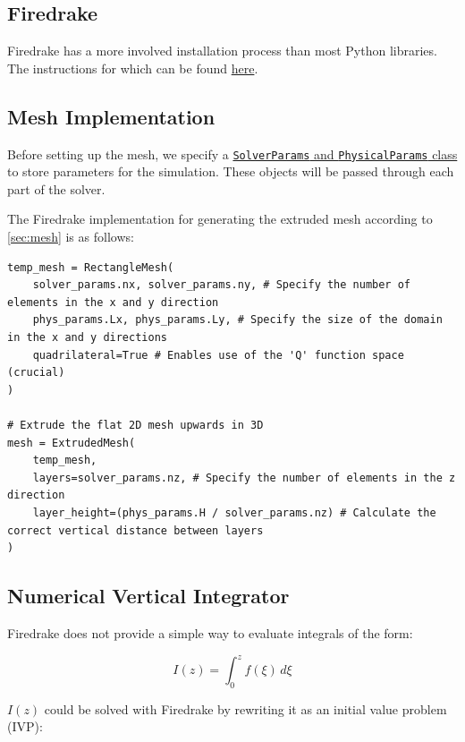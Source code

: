 \documentclass{article}
\begin{document}
\newpage
\begin{appendices}

\section{Firedrake}

Firedrake has a more involved installation process than most Python libraries.
The instructions for which can be found \href{https://www.firedrakeproject.org/install.html}{here}.

\subsection{Mesh Implementation}\label{app:mesh}
Before setting up the mesh, we specify a \href{https://github.com/TrueCP6/PV-Inversion/blob/master/parameters.py}{\texttt{SolverParams} and \texttt{PhysicalParams} class} to store parameters for the simulation. These objects will be passed through each part of the solver.

The Firedrake implementation for generating the extruded mesh according to \cref{sec:mesh} is as follows:

\begin{verbatim}
temp_mesh = RectangleMesh(
    solver_params.nx, solver_params.ny, # Specify the number of elements in the x and y direction
    phys_params.Lx, phys_params.Ly, # Specify the size of the domain in the x and y directions
    quadrilateral=True # Enables use of the 'Q' function space (crucial)
)

# Extrude the flat 2D mesh upwards in 3D
mesh = ExtrudedMesh(
    temp_mesh,
    layers=solver_params.nz, # Specify the number of elements in the z direction
    layer_height=(phys_params.H / solver_params.nz) # Calculate the correct vertical distance between layers
)
\end{verbatim}

\subsection{Numerical Vertical Integrator}\label{app:vert_int}

Firedrake does not provide a simple way to evaluate integrals of the form:

\begin{equation}
    I(z) = \int_0^z f(\xi) \,d\xi
\end{equation}

$I(z)$ could be solved with Firedrake by rewriting it as an initial value problem (IVP):


\end{appendices}
\end{document}
